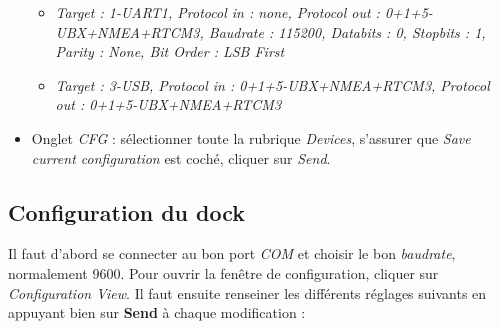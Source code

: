 \documentclass[12pt]{report}
\begin{document}
\begin{itemize}
    \begin{itemize}
        \item \textit{Target : 1-UART1, Protocol in : none, Protocol out : 0+1+5-UBX+NMEA+RTCM3, Baudrate : 115200, Databits : 0, Stopbits : 1, Parity : None, Bit Order : LSB First}
        \item \textit{Target : 3-USB, Protocol in : 0+1+5-UBX+NMEA+RTCM3, Protocol out : 0+1+5-UBX+NMEA+RTCM3}
    \end{itemize}
    \item Onglet \textit{CFG} : sélectionner toute la rubrique \textit{Devices}, s'assurer que \textit{Save current configuration} est coché, cliquer sur \textit{Send}.
\end{itemize}

\subsection{Configuration du dock}
Il faut d'abord se connecter au bon port \textit{COM} et choisir le bon \textit{baudrate}, normalement 9600.
Pour ouvrir la fenêtre de configuration, cliquer sur \textit{Configuration View}. Il faut ensuite renseiner les différents réglages suivants en appuyant bien sur \textbf{Send} à chaque modification : 
\end{document}
